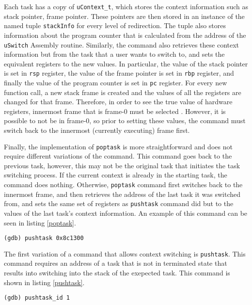 Each task has a copy of \verb|uContext_t|, which stores the context
information such as stack pointer, frame pointer. These pointers are then
stored in an instance of the named tuple \verb|stackInfo| for every level of
redirection. The tuple also stores information about the program counter that
is calculated from the address of the \verb|uSwitch| Assembly routine. Similarly, the command
also retrieves these context information but from the task that a user wants to switch to, and
sets the equivalent registers to the new values. In particular, the value of the stack
pointer is set in \verb|rsp| register, the value of the frame pointer is set in \verb|rbp|
register, and finally the value of the program counter is set in \verb|pc| register.
For every new function call, a new stack frame is created and the values of all
the registers are changed for that frame. Therefore, in
order to see the true value of hardware registers, innermost frame that is
frame-0 must be selected \cite{reference11}. However, it is possible to not be in frame-0, so prior to setting these values,
the command must switch back to the innermost (currently executing) frame first.

Finally, the implementation of \verb|poptask| is more straightforward and does
not require different variations of the command. This command goes back to the previous task, however, this may not be the original
task that initiates the task switching process. If the current context is
already in the starting task, the command does nothing. Otherwise,
\verb|poptask| command first switches back to the innermost frame, and then
retrieves the
address of the last task it was switched from, and sets the same set of registers as
\verb|pushtask| command did but to the values of the last task's context
information. An example of this command can be seen in listing \ref{poptask}.

\begin{lstlisting}[caption={\text{pushtask} command}, label={pushtask}]
(gdb) pushtask 0x8c1300
\end{lstlisting}
The first variation of a command that allows context switching is \verb|pushtask|. This command requires an
address of a task that is not in terminated state that results into switching
into the stack of the exepected task. This command is shown in listing
\ref{pushtask}.

\begin{lstlisting}[caption={\text{pushtask\_id} command}, label={pushtask-id}]
(gdb) pushtask_id 1
\end{lstlisting}

